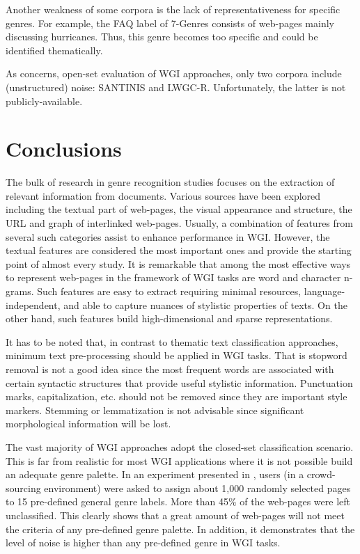Another weakness of some corpora is the lack of representativeness for specific genres. For example, the FAQ label of 7-Genres consists of web-pages mainly discussing hurricanes. Thus, this genre becomes too specific and could be identified thematically. 

As concerns, open-set evaluation of WGI approaches, only two corpora include (unstructured) noise: SANTINIS and LWGC-R. Unfortunately, the latter is not publicly-available. 

\section{Conclusions}\label{chap:relevant_work:sec:intro}

The bulk of research in genre recognition studies focuses on the extraction of relevant information from documents. Various sources have been explored including the textual part of web-pages, the visual appearance and structure, the URL and graph of interlinked web-pages. Usually, a combination of features from several such categories assist to enhance performance in WGI. However, the textual features are considered the most important ones and provide the starting point of almost every study. It is remarkable that among the most effective ways to represent web-pages in the framework of WGI tasks are word and character n-grams. Such features are easy to extract requiring minimal resources, language-independent, and able to capture nuances of stylistic properties of texts. On the other hand, such features build high-dimensional and sparse representations.

It has to be noted that, in contrast to thematic text classification approaches, minimum text pre-processing should be applied in WGI tasks. That is stopword removal is not a good idea since the most frequent words are associated with certain syntactic structures that provide useful stylistic information. Punctuation marks, capitalization, etc. should not be removed since they are important style markers. Stemming or lemmatization is not advisable since significant morphological information will be lost.

The vast majority of WGI approaches adopt the closed-set classification scenario. This is far from realistic for most WGI applications where it is not possible build an adequate genre palette. In an experiment presented in , users (in a crowd-sourcing environment) were asked to assign about 1,000 randomly selected pages to 15 pre-defined general genre labels. More than 45\% of the web-pages were left unclassified. This clearly shows that a great amount of web-pages will not meet the criteria of any pre-defined genre palette. In addition, it demonstrates that the level of noise is higher than any pre-defined genre in WGI tasks. 


